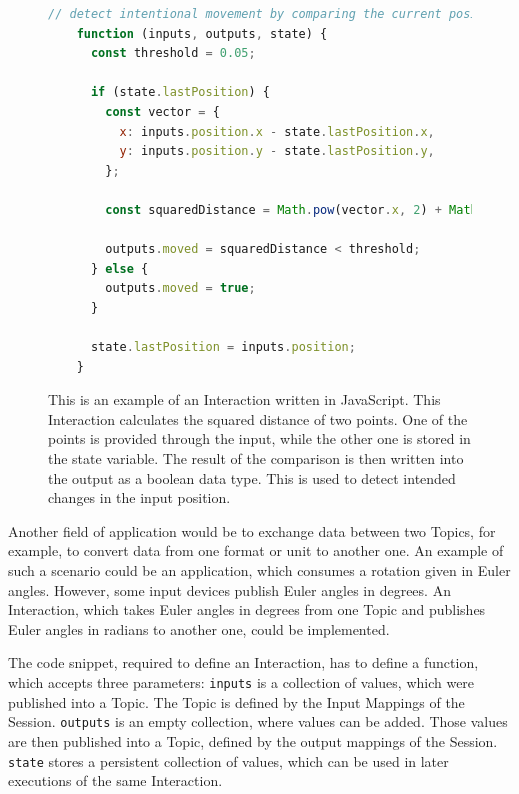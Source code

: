 \begin{figure}[H]
  \begin{lstlisting}[language=JavaScript]
    // detect intentional movement by comparing the current position with a previous one
    function (inputs, outputs, state) {
      const threshold = 0.05;

      if (state.lastPosition) {
        const vector = {
          x: inputs.position.x - state.lastPosition.x,
          y: inputs.position.y - state.lastPosition.y,
        };
  
        const squaredDistance = Math.pow(vector.x, 2) + Math.pow(vector.y, 2);
  
        outputs.moved = squaredDistance < threshold;
      } else {
        outputs.moved = true;
      }

      state.lastPosition = inputs.position;
    }
  \end{lstlisting}
  \caption[Basic UBII interaction in JavaScript]{This is an example of an Interaction written in JavaScript. This Interaction calculates the squared distance of two points. One of the points is provided through the input, while the other one is stored in the state variable. The result of the comparison is then written into the output as a boolean data type. This is used to detect intended changes in the input position.}\label{fig:ubii-interaction-example}
\end{figure}

Another field of application would be to exchange data between two Topics, for example, to convert data from one format or unit to another one. An example of such a scenario could be an application, which consumes a rotation given in Euler angles. However, some input devices publish Euler angles in degrees. An Interaction, which takes Euler angles in degrees from one Topic and publishes Euler angles in radians to another one, could be implemented.

The code snippet, required to define an Interaction, has to define a function, which accepts three parameters: 
\lstinline{inputs} is a collection of values, which were published into a Topic. The Topic is defined by the Input Mappings of the Session. \lstinline{outputs} is an empty collection, where values can be added. Those values are then published into a Topic, defined by the output mappings of the Session. \lstinline{state} stores a persistent collection of values, which can be used in later executions of the same Interaction.